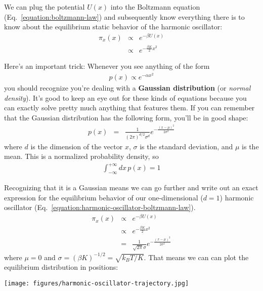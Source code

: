 \documentclass[english,course]{lecture}
\begin{document}
We can plug the potential $U(x)$ into the Boltzmann equation (Eq.~\ref{equation:boltzmann-law}) and subsequently know everything there is to know about the equilibrium static behavior of the harmonic oscillator:
\begin{eqnarray}
\pi_x(x) &\propto& e^{-\beta U(x)} \\
&\propto& e^{-\frac{\beta K}{2} x^2} \label{equation:harmonic-oscillator-boltzmann-law}
\end{eqnarray}

Here's an important trick: Whenever you see anything of the form
\begin{eqnarray}
p(x) \propto e^{-\alpha x^2}
\end{eqnarray}
you should recognize you're dealing with a {\bf Gaussian distribution} (or \emph{normal density}). 
It's good to keep an eye out for these kinds of equations because you can exactly solve pretty much anything that features them.
If you can remember that the Gaussian distribution has the following form, you'll be in good shape:
\begin{eqnarray}
p(x) &=& \frac{1}{(2 \pi)^{d/2} \sigma^d} e^{-\frac{(x - \mu)^2}{2 \sigma^2}}
\end{eqnarray}
where $d$ is the dimension of the vector $x$, $\sigma$ is the standard deviation, and $\mu$ is the mean.
This is a normalized probability density, so 
\begin{eqnarray}
\int_{-\infty}^{+\infty} dx \, p(x) = 1
\end{eqnarray}

Recognizing that it is a Gaussian means we can go further and write out an exact expression for the equilibrium behavior of our one-dimensional ($d=1$) harmonic oscillator (Eq.~\ref{equation:harmonic-oscillator-boltzmann-law}).
\begin{eqnarray}
\pi_x(x) &\propto& e^{-\beta U(x)} \\
&\propto& e^{-\frac{\beta K}{2} x^2} \\
&=& \frac{1}{\sqrt{2 \pi} \sigma} e^{-\frac{(x - \mu)^2}{2 \sigma^2}}
\end{eqnarray}
where $\mu = 0$ and $\sigma = (\beta K)^{-1/2} = \sqrt{k_B T / K}$.
That means we can can plot the equilibrium distribution in positions:

\begin{centering}
\texttt{[image: figures/harmonic-oscillator-trajectory.jpg]}

\end{centering}
\end{document}
